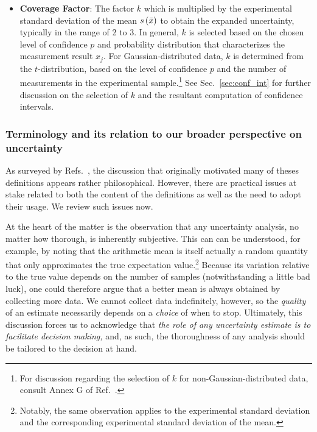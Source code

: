 \begin{itemize}
\item {\bf Coverage Factor}:
  The factor $k$ which is multiplied by the experimental standard deviation of the mean \hyperref[def:exp_st_dev_mean]{$s\left( \bar{x} \right)$} to obtain the expanded uncertainty, typically in the range of 2 to 3. In general, $k$ is selected based on the chosen level of confidence $p$ and probability distribution that characterizes the measurement result $x_j$. For Gaussian-distributed data, $k$ is determined from the $t$-distribution, based on the level of confidence $p$ and the number of measurements in the experimental sample.\footnote{For discussion regarding the selection of $k$ for non-Gaussian-distributed data, consult Annex G of Ref.~\cite{JCGM:GUM2008}.} See Sec.~\ref{sec:conf_int} for further discussion on the selection of $k$ and the resultant computation of confidence intervals.
  \label{def:coveragefactor}
  
\end{itemize}

\subsubsection{Terminology and its relation to our broader perspective on uncertainty}

As surveyed by Refs.~\citep{JCGM:GUM2008,JCGM:VIM2012}, the discussion that originally motivated many of theses definitions appears rather philosophical.  However, there are practical issues at stake related to both the content of the definitions as well as the need to adopt their usage.  We review such issues now.

At the heart of the matter is the observation that any uncertainty analysis, no matter how thorough, is inherently subjective.  This can can be understood, for example, by noting that the arithmetic mean is itself actually a random quantity that only approximates the true expectation value.\footnote{Notably, the same observation applies to the experimental standard deviation and the corresponding experimental standard deviation of the mean.}  Because its variation relative to the true value depends on the number of samples (notwithstanding a little bad luck), one could therefore argue that a better mean is always obtained by collecting more data.   We cannot collect data indefinitely, however, so the {\it quality} of an estimate necessarily depends on a {\it choice} of when to stop.  Ultimately, this discussion forces us to acknowledge that {\it the role of any uncertainty estimate is to facilitate decision making,} and, as such, the thoroughness of any analysis should be tailored to the decision at hand.  

